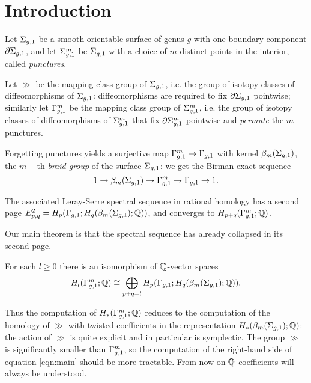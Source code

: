 \section{Introduction}
Let $\Sigma_{g,1}$ be a smooth orientable surface of genus $g$ with one boundary component $\partial\Sigma_{g,1}$, and let $\Sigma_{g,1}^m$ be $\Sigma_{g,1}$ with
a choice of $m$ distinct points in the interior, called \emph{punctures}.

Let $\gg$ be the mapping class group of $\Sigma_{g,1}$, i.e. the group of isotopy classes of diffeomorphisms of $\Sigma_{g,1}$:
diffeomorphisms are required to fix $\partial\Sigma_{g,1}$ pointwise; similarly let $\Gamma_{g,1}^m$ be the mapping class group of $\Sigma_{g,1}^m$, i.e.
the group of isotopy classes of diffeomorphisms of $\Sigma_{g,1}^m$ that fix $\partial\Sigma_{g,1}^m$ pointwise and \emph{permute} the $m$ punctures.

Forgetting punctures yields a surjective map $\Gamma_{g,1}^m\to\Gamma_{g,1}$ with kernel $\beta_{m}(\Sigma_{g,1})$,
the $m-$th \emph{braid group} of the surface $\Sigma_{g,1}$: we get the Birman exact sequence
\begin{equation}
\label{eqn:Birman}
1\to\beta_{m}(\Sigma_{g,1})\to\Gamma_{g,1}^m\to\Gamma_{g,1}\to 1.
\end{equation}

The associated Leray-Serre spectral sequence in rational homology has a second page $E^2_{p,q}=H_p(\Gamma_{g,1};H_q(\beta_{m}(\Sigma_{g,1});\mathbb{Q}))$,
and converges to $H_{p+q}(\Gamma_{g,1}^m;\mathbb{Q})$.

Our main theorem is that the spectral sequence has already collapsed in its second page.
\begin{thm}
\label{thm:main}
For each $l\geq 0$ there is an isomorphism of $\mathbb{Q}$-vector spaces
\begin{equation}
\label{eqn:main}
 H_l(\Gamma_{g,1}^m;\mathbb{Q})\cong \bigoplus_{p+q=l} H_p(\Gamma_{g,1};H_q(\beta_{m}(\Sigma_{g,1});\mathbb{Q})).
\end{equation}
\end{thm}
Thus the computation of $H_*(\Gamma_{g,1}^m;\mathbb{Q})$ reduces to the computation of the homology of $\gg$ with
twisted coefficients in the representation $H_*(\beta_{m}(\Sigma_{g,1});\mathbb{Q})$: the action of $\gg$ is quite explicit
and in particular is symplectic. The group $\gg$ is significantly smaller than $\Gamma_{g,1}^m$, so the
computation of the right-hand side of equation \ref{eqn:main} should be more tractable. From now on $\mathbb{Q}$-coefficients will always be understood.
